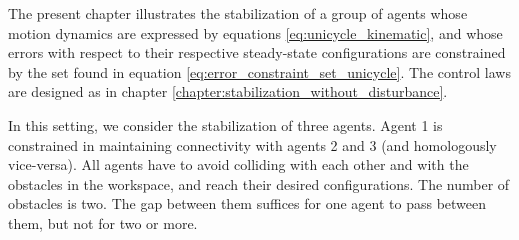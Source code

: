 The present chapter illustrates the stabilization of a group of agents whose
motion dynamics are expressed by equations \eqref{eq:unicycle_kinematic}, and
whose errors with respect to their respective steady-state configurations are
constrained by the set found in equation \eqref{eq:error_constraint_set_unicycle}.
The control laws are designed as in chapter
\ref{chapter:stabilization_without_disturbance}.

In this setting, we consider the stabilization of three agents. Agent 1
is constrained in maintaining connectivity with agents 2 and 3 (and
homologously vice-versa). All agents have to avoid colliding with each other
and with the obstacles in the workspace, and reach their desired
configurations. The number of obstacles is two. The gap between them
suffices for one agent to pass between them, but not for two or more.
